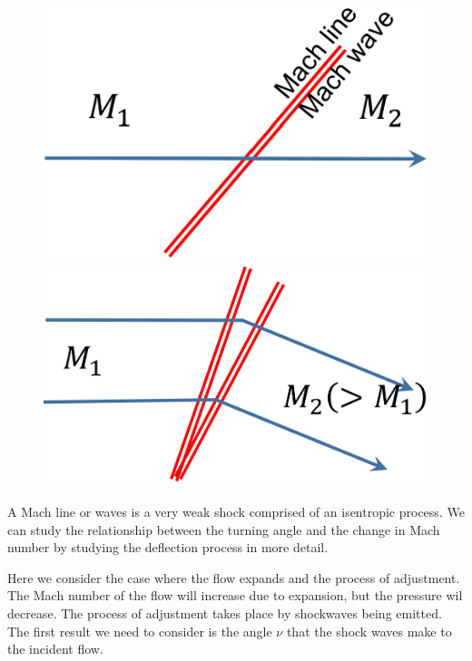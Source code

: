 \documentclass[class=report, crop=false, 12pt,a4paper]{standalone}
\begin{document}
\begin{figure}[H]
    \centering
    \begin{minipage}{.5\textwidth}
        \centering
        \includegraphics[width=.8\linewidth]{../img/diagram22.png}
    \end{minipage}%
    \begin{minipage}{.5\textwidth}
        \centering
        \includegraphics[width=.8\linewidth]{../img/diagram23.png}
    \end{minipage}
\end{figure}
A Mach line or waves is a very weak shock comprised of an isentropic process. We can study the relationship between the turning angle and the change in Mach number by studying the deflection process in more detail.

Here we consider the case where the flow expands and the process of adjustment. The Mach number of the flow will increase due to expansion, but the pressure wil decrease. The process of adjustment takes place by shockwaves being emitted. The first result we need to consider is the angle $\nu$ that the shock waves make to the incident flow.
\end{document}
